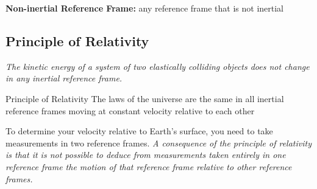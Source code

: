         \textbf{Non-inertial Reference Frame:} any reference frame that is not inertial



    \subsection{Principle of Relativity}

        \textit{The kinetic energy of a system of two elastically colliding objects does not change in any inertial reference frame.}  \\

        \begin{tbhtheorem}{Principle of Relativity}
            The laws of the universe are the same in all inertial reference frames moving at constant velocity relative to each other
        \end{tbhtheorem}

        To determine your velocity relative to Earth's surface, you need to take measurements in two reference frames. \textit{A consequence of the principle of relativity is that it is not possible to deduce from
        measurements taken entirely in one reference frame the motion of that reference frame relative to other reference frames.}
